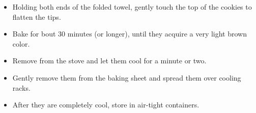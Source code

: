 \documentclass[11pt,letterpaper]{article}
\begin{document}
\begin{description}
\begin{enumerate}
\begin{itemize}
	\item Holding both ends of the folded towel, gently touch the top of the cookies to flatten the tips.
	\item Bake for bout 30 minutes (or longer), until they acquire a very light brown color.
	\item Remove from the stove and let them cool for a minute or two.
	\item Gently remove them from the baking sheet and spread them over cooling racks.
	\item After they are completely cool, store in air-tight containers.
	\end{itemize}
	\end{enumerate}

\end{description}
\end{document}
